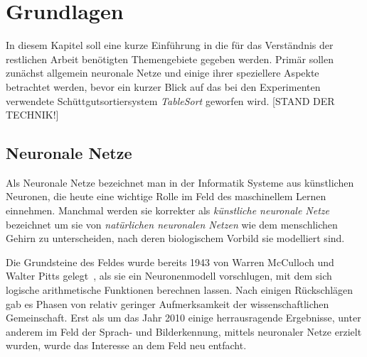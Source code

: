 \chapter{Grundlagen}




In diesem Kapitel soll eine kurze Einführung in die für das Verständnis der restlichen Arbeit benötigten Themengebiete gegeben werden.
Primär sollen zunächst allgemein neuronale Netze und einige ihrer speziellere Aspekte betrachtet werden, 
bevor ein kurzer Blick auf das bei den Experimenten verwendete Schüttgutsortiersystem \textit{TableSort} geworfen wird. 
[STAND DER TECHNIK!]

% 

\section{Neuronale Netze}

Als Neuronale Netze  %
bezeichnet man in der Informatik Systeme aus künstlichen Neuronen, die heute eine wichtige Rolle im Feld des maschinellem Lernen einnehmen.
Manchmal werden sie korrekter als \textit{künstliche neuronale Netze} bezeichnet um sie von \textit{natürlichen neuronalen Netzen} 
wie dem menschlichen Gehirn zu unterscheiden, nach deren biologischem Vorbild sie modelliert sind.


Die Grundsteine des Feldes wurde bereits 1943 von Warren McCulloch und Walter Pitts gelegt~\cite{mcculloch1943logical}, 
als sie ein Neuronenmodell vorschlugen, mit dem sich logische arithmetische Funktionen berechnen lassen. 
Nach einigen Rückschlägen gab es Phasen von relativ geringer Aufmerksamkeit der wissenschaftlichen Gemeinschaft. 
Erst als um das Jahr 2010 einige herrausragende Ergebnisse, unter anderem im Feld der Sprach- und Bilderkennung, 
mittels neuronaler Netze erzielt wurden, wurde das Interesse an dem Feld neu entfacht. 



